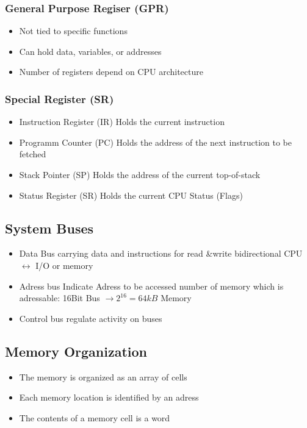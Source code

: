 \begin{multicols}{2}
	\subsubsection{General Purpose Regiser (GPR)}
	\begin{itemize}
		\item Not tied to specific functions
		\item Can hold data, variables, or addresses
		\item Number of registers depend on CPU architecture			
	\end{itemize}
	\subsubsection{Special Register (SR)}	
	\begin{itemize}
		\item Instruction Register (IR)
		\subitem Holds the current instruction 
		\item Programm Counter (PC)
		\subitem Holds the address of the next instruction to be fetched
		\item Stack Pointer (SP)
		\subitem Holds the address of the current top-of-stack 
		\item Status Register (SR)
		\subitem Holds the current CPU Status (Flags)
	\end{itemize}
\end{multicols}
\subsection{System Buses }
	\begin{itemize}
		\item Data Bus
		\subitem carrying data and instructions for read \&write
		\subitem bidirectional CPU $\leftrightarrow$ I/O or memory
		\item Adress bus
		\subitem Indicate Adress to be accessed
		\subitem number of memory which is adressable: 16Bit Bus $\rightarrow 2^{16}=64kB$ Memory
		\item Control bus
		\subitem regulate activity on buses		
	\end{itemize}
\subsection{Memory Organization }
		\begin{itemize}
			\item The memory is organized as an array of cells
			\item Each memory location is identified by an adress
			\item The contents of a memory cell is a word
		\end{itemize}
